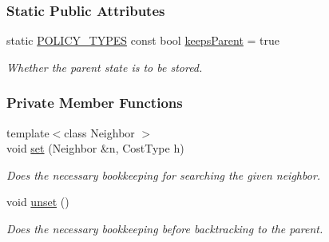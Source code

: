 \subsubsection*{Static Public Attributes}
\begin{DoxyCompactItemize}
\item 
static \hyperlink{extensions_2shared__policies_2headers_8h_ae70a06fa4631780beea14971eb36a562}{P\+O\+L\+I\+C\+Y\+\_\+\+T\+Y\+P\+ES} const bool \hyperlink{structslb_1_1ext_1_1policy_1_1backtrackLock_1_1Copy_ae204f588322f4f8327718d3d58a9f716}{keeps\+Parent} = true\hypertarget{structslb_1_1ext_1_1policy_1_1backtrackLock_1_1Copy_ae204f588322f4f8327718d3d58a9f716}{}\label{structslb_1_1ext_1_1policy_1_1backtrackLock_1_1Copy_ae204f588322f4f8327718d3d58a9f716}

\begin{DoxyCompactList}\small\item\em Whether the parent state is to be stored. \end{DoxyCompactList}\end{DoxyCompactItemize}
\subsubsection*{Private Member Functions}
\begin{DoxyCompactItemize}
\item 
{\footnotesize template$<$class Neighbor $>$ }\\void \hyperlink{structslb_1_1ext_1_1policy_1_1backtrackLock_1_1Copy_a1282c604aacd043dcc28f1eaa25e6297}{set} (Neighbor \&n, Cost\+Type h)
\begin{DoxyCompactList}\small\item\em Does the necessary bookkeeping for searching the given neighbor. \end{DoxyCompactList}\item 
void \hyperlink{structslb_1_1ext_1_1policy_1_1backtrackLock_1_1Copy_a5422a7c3500ba11c4f2ee3b09a96e7fb}{unset} ()\hypertarget{structslb_1_1ext_1_1policy_1_1backtrackLock_1_1Copy_a5422a7c3500ba11c4f2ee3b09a96e7fb}{}\label{structslb_1_1ext_1_1policy_1_1backtrackLock_1_1Copy_a5422a7c3500ba11c4f2ee3b09a96e7fb}

\begin{DoxyCompactList}\small\item\em Does the necessary bookkeeping before backtracking to the parent. \end{DoxyCompactList}\end{DoxyCompactItemize}
